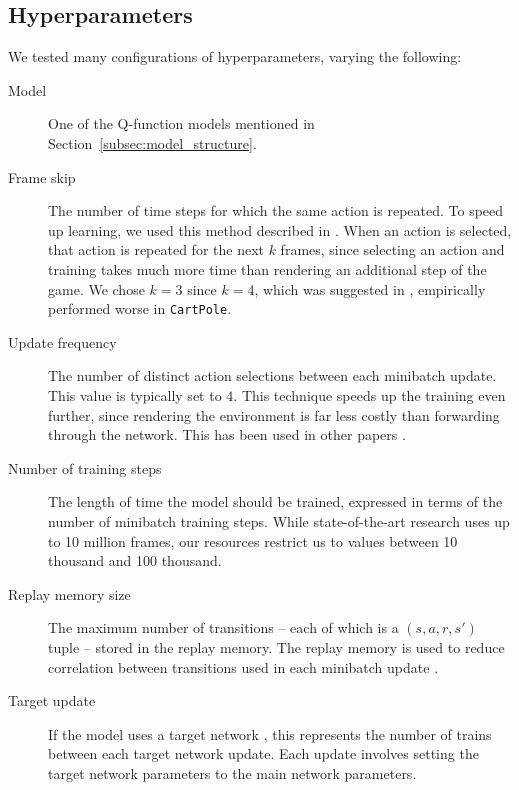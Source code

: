 \documentclass[11pt]{article}
\newcommand{\cp}{\texttt{CartPole}}
\begin{document}
\subsection{Hyperparameters}

We tested many configurations of hyperparameters, varying the following: 

\begin{description}
    \item[Model] One of the Q-function models mentioned in Section~\ref{subsec:model_structure}.
    
    \item[Frame skip] The number of time steps for which the same action is repeated. To speed up learning, we used this method described in \cite{mnih2013playing, mnih2015human}. When an action is selected, that action is repeated for the next $k$ frames, since selecting an action and training takes much more time than rendering an additional step of the game. We chose $k = 3$ since $k = 4$, which was suggested in \cite{mnih2013playing, mnih2015human}, empirically performed worse in \cp. 
    
    \item[Update frequency] The number of distinct action selections between each minibatch update. This value is typically set to $4$. This technique speeds up the training even further, since rendering the environment is far less costly than forwarding through the network. This has been used in other papers \cite{mnih2013playing, mnih2015human, van2016deep}.
    
    \item[Number of training steps] The length of time the model should be trained, expressed in terms of the number of minibatch training steps. While state-of-the-art research uses up to 10 million frames, our resources restrict us to values between 10 thousand and 100 thousand.
    
    \item[Replay memory size] The maximum number of transitions -- each of which is a $(s, a, r, s')$ tuple -- stored in the replay memory. The replay memory is used to reduce correlation between transitions used in each minibatch update \cite{mnih2013playing, mnih2015human}.
    
    \item[Target update] If the model uses a target network \cite{mnih2015human}, this represents the number of trains between each target network update. Each update involves setting the target network parameters to the main network parameters.
    

\end{description}
\end{document}
